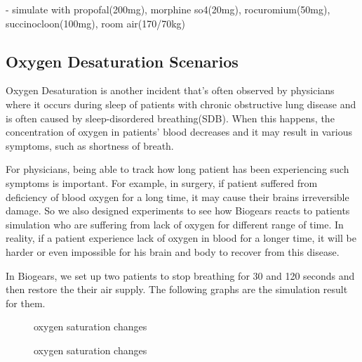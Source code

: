 \documentclass[a4paper]{article}
\begin{document}
- simulate with propofal(200mg), morphine so4(20mg), rocuromium(50mg), succinocloon(100mg), room air(170/70kg)

\subsection{Oxygen Desaturation Scenarios}

Oxygen Desaturation is another incident that's often observed by physicians where it occurs during sleep of patients with chronic obstructive lung disease and is often caused by sleep-disordered breathing(SDB)\cite{low_oxygen_sleep}. When this happens, the concentration of oxygen in patients' blood decreases and it may result in various symptoms, such as shortness of breath.

For physicians, being able to track how long patient has been experiencing such symptoms is important. For example, in surgery, if patient suffered from deficiency of blood oxygen for a long time, it may cause their brains irreversible damage. So we also designed experiments to see how Biogears reacts to patients simulation who are suffering from lack of oxygen for different range of time. In reality, if a patient experience lack of oxygen in blood for a longer time, it will be harder or even impossible for his brain and body to recover from this disease.

In Biogears, we set up two patients to stop breathing for 30 and 120 seconds and then restore the their air supply. The following graphs are the simulation result for them.

\begin{figure}[!htb]\centering
   \begin{minipage}{0.49\textwidth}
     \caption{oxygen saturation changes}
     \label{fig:patient stoping breathing}
     
   \end{minipage}
   \begin {minipage}{0.49\textwidth}
     \caption{oxygen saturation changes}
     \label{fig:patient stoping breathing}
   \end{minipage}
\end{figure}
\end{document}
